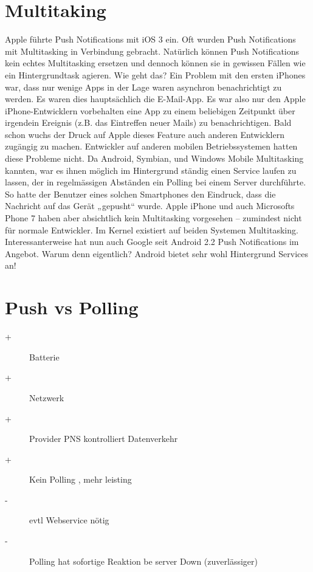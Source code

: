 \documentclass[a4paper,10pt]{scrreprt}
\begin{document}
\section{Multitaking}
Apple führte Push Notifications mit iOS 3 ein. Oft wurden Push Notifications mit Multitasking in Verbindung
gebracht. Natürlich können Push Notifications kein echtes Multitasking ersetzen und dennoch können sie in
gewissen Fällen wie ein Hintergrundtask agieren. Wie geht das?
Ein Problem mit den ersten iPhones war, dass nur wenige Apps in der Lage waren asynchron benachrichtigt zu
werden. Es waren dies hauptsächlich die E-Mail-App. Es war also nur den Apple iPhone-Entwicklern vorbehalten
eine App zu einem beliebigen Zeitpunkt über irgendein Ereignis (z.B. das Eintreffen neuer Mails) zu
benachrichtigen. Bald schon wuchs der Druck auf Apple dieses Feature auch anderen Entwicklern zugängig zu
machen.
Entwickler auf anderen mobilen Betriebssystemen hatten diese Probleme nicht. Da Android, Symbian, und
Windows Mobile Multitasking kannten, war es ihnen möglich im Hintergrund ständig einen Service laufen zu
lassen, der in regelmässigen Abständen ein Polling bei einem Server durchführte. So hatte der Benutzer eines
solchen Smartphones den Eindruck, dass die Nachricht auf das Gerät „gepusht“ wurde.
Apple iPhone und auch Microsofts Phone 7 haben aber absichtlich kein Multitasking vorgesehen – zumindest
nicht für normale Entwickler. Im Kernel existiert auf beiden Systemen Multitasking. Interessanterweise hat nun
auch Google seit Android 2.2 Push Notifications im Angebot. Warum denn eigentlich? Android bietet sehr wohl
Hintergrund Services an!




\section{Push vs Polling}

\begin{description}
 \item [+] Batterie
  \item [+] Netzwerk
   \item [+] Provider PNS kontrolliert Datenverkehr
    \item [+] Kein Polling , mehr leisting
    \item [-] evtl Webservice nötig
    \item [-] Polling hat sofortige Reaktion be server Down (zuverlässiger)
\end{description}
\end{document}

